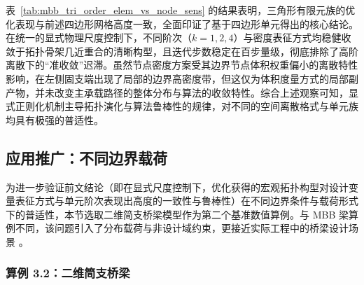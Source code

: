 表~\ref{tab:mbb_tri_order_elem_vs_node_sens} 的结果表明，三角形有限元族的优化表现与前述四边形网格高度一致，全面印证了基于四边形单元得出的核心结论。在统一的显式物理尺度控制下，不同阶次（$k=1,2,4$）与密度表征方式均稳健收敛于拓扑骨架几近重合的清晰构型，且迭代步数稳定在百步量级，彻底排除了高阶离散下的“准收敛”迟滞。虽然节点密度方案受其边界节点体积权重偏小的离散特性影响，在左侧固支端出现了局部的边界高密度带，但这仅为体积度量方式的局部副产物，并未改变主承载路径的整体分布与算法的收敛特性。综合上述观察可知，显式正则化机制主导拓扑演化与算法鲁棒性的规律，对不同的空间离散格式与单元族均具有极强的普适性。

%


\subsection{应用推广：不同边界载荷}
\label{subsec:case_boundary_loads}

为进一步验证前文结论（即在显式尺度控制下，优化获得的宏观拓扑构型对设计变量表征方式与单元阶次表现出高度的一致性与鲁棒性）在不同边界条件与载荷形式下的普适性，本节选取二维简支桥梁模型作为第二个基准数值算例。与 MBB 梁算例不同，该问题引入了分布载荷与非设计域约束，更接近实际工程中的桥梁设计场景 。

\subsubsection*{算例 3.2：二维简支桥梁}

